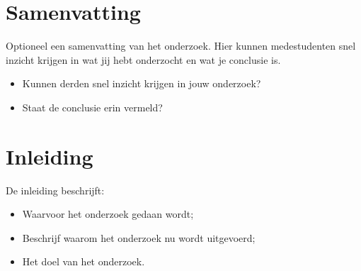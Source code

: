 \documentclass[a4paper, 11pt, oneside]{report}
\begin{document}

\tableofcontents
\clearpage






\chapter{Samenvatting}
Optioneel een samenvatting van het onderzoek. Hier kunnen medestudenten snel inzicht krijgen in wat jij hebt onderzocht en wat je conclusie is.
\begin{itemize}
	\item Kunnen derden snel inzicht krijgen in jouw onderzoek?
	\item Staat de conclusie erin vermeld?
\end{itemize}

\chapter{Inleiding}
\label{chapter:inleiding}
De inleiding beschrijft:
\begin{itemize}
\item Waarvoor het onderzoek gedaan wordt;
\item Beschrijf waarom het onderzoek nu wordt uitgevoerd;
\item Het doel van het onderzoek.
\end{itemize}
\end{document}
